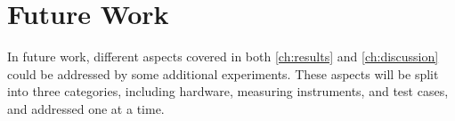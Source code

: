 \chapter{Future Work}\label{ch:future_work}

In future work, different aspects covered in both \cref{ch:results} and \cref{ch:discussion} could be addressed by some additional experiments. These aspects will be split into three categories, including hardware, measuring instruments, and test cases, and addressed one at a time.







